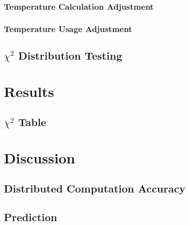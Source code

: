 \documentclass[a4paper]{article}
\begin{document}
        \subsubsection{Temperature Calculation Adjustment}
        \subsubsection{Temperature Usage Adjustment}
    \subsection{$\chi^2$ Distribution Testing}
\section{Results}
    \subsection{$\chi^2$ Table}
\section{Discussion}
    \subsection{Distributed Computation Accuracy}
    \subsection{Prediction}



\end{document}
